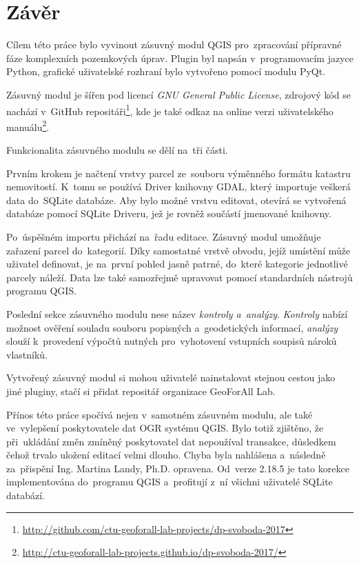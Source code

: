 \chapter{Závěr}
\label{zaver}

Cílem této práce bylo vyvinout zásuvný modul QGIS pro~zpracování
přípravné fáze komplexních pozemkových úprav. Plugin byl napsán
v~programovacím jazyce Python, grafické uživatelské rozhraní bylo
vytvořeno pomocí modulu PyQt.

Zásuvný modul je šířen pod licencí \textit{GNU General Public
License}, zdrojový kód se nachází v~GitHub
repositáři\footnote{\url{http://github.com/ctu-geoforall-lab-projects/dp-svoboda-2017}},
kde je také odkaz na online verzi uživatelského
manuálu\footnote{\url{http://ctu-geoforall-lab-projects.github.io/dp-svoboda-2017/}}.

Funkcionalita zásuvného modulu se dělí na~tři části.

Prvním krokem je načtení vrstvy parcel ze~souboru výměnného formátu
katastru nemovitostí. K~tomu se používá  Driver knihovny GDAL,
který importuje veš\-kerá data do~SQLite databáze. Aby bylo možné
vrstvu editovat, otevírá se vytvořená databáze pomocí SQLite Driveru,
jež je rovněž součástí jmenované knihovny.

Po~úspěšném importu přichází na~řadu editace. Zásuvný modul umožňuje
zařazení parcel do~kategorií. Díky samostatné vrstvě obvodu, jejíž
umístění může uživatel definovat, je na~první pohled jasně patrné,
do~které kategorie jednotlivé parcely náleží. Data lze také samozřejmě
upravovat pomocí standardních nástrojů programu QGIS.

Poslední sekce zásuvného modulu nese název \textit{kontroly
a~analýzy}. \textit{Kontroly} nabízí možnost ověření souladu souboru
popisných a~geodetických informací, \textit{analýzy} slouží
k~provedení výpočtů nutných pro~vyhotovení vstupních soupisů nároků
vlastníků.

Vytvořený zásuvný modul si mohou uživatelé nainstalovat stejnou cestou
jako jiné pluginy, stačí si přidat repositář organizace GeoForAll Lab.

Přínos této práce spočívá nejen v~samotném zásuvném modulu, ale také
ve~vylep\-šení poskytovatele dat OGR systému QGIS. Bylo totiž
zjištěno, že při~ukládání změn zmíněný poskytovatel dat nepoužíval
transakce, důsledkem čehož trvalo uložení editací velmi dlouho. Chyba
byla nahlášena a~následně za~přispění Ing. Martina Landy,
Ph.D. opravena. Od~verze 2.18.5 je tato korekce implementována
do~programu QGIS a~profitují z~ní všichni uživatelé SQLite databází.


